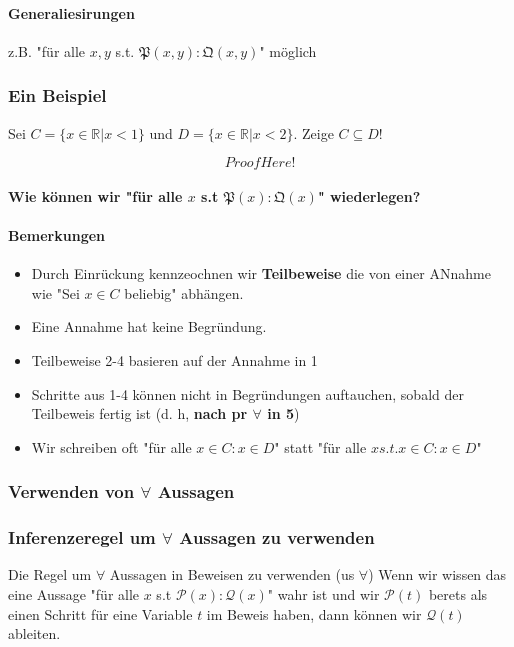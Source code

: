             \paragraph{Generaliesirungen} z.B. "für alle $x, y$ s.t. $\mathfrak{P}(x,y):\mathfrak{Q}(x,y)$" möglich

        \subsubsection{Ein Beispiel} 
            Sei $C = \{x \in \mathbb{R} \vert x < 1\}$ und $D = \{x \in \mathbb{R}\vert x < 2\}$. Zeige $C \subseteq D$! 

            \[Proof Here!\]


        \paragraph*
            {
                Wie können wir "für alle $x$ s.t $\mathfrak{P}(x) : \mathfrak{Q}(x)$" wiederlegen?
            }

        \paragraph{Bemerkungen}
            \begin{itemize}
                \item Durch Einrückung kennzeochnen wir \textbf{Teilbeweise} die von einer ANnahme wie "Sei $x \in C$ beliebig" abhängen.
                \item Eine Annahme hat keine Begründung.
                \item Teilbeweise 2-4 basieren auf der Annahme in 1
                \item Schritte aus 1-4 können nicht in Begründungen auftauchen, sobald der Teilbeweis fertig ist (d. h, \textbf{nach pr $\forall$ in 5})
                \item Wir schreiben oft "für alle $x \in C : x \in D$" statt "für alle $x s.t. x \in C : x \in D$" 
            \end{itemize}

        \subsubsection{Verwenden von $\forall$ Aussagen}
        \subsubsection{Inferenzeregel um $\forall$ Aussagen zu verwenden}
        {
            Die Regel um $\forall$ Aussagen in Beweisen zu verwenden (us $\forall$)
            }
        {
            Wenn wir wissen das eine Aussage "für alle $x$ s.t $\mathcal{P}(x) : \mathcal{Q}(x)$" wahr ist und wir $\mathcal{P}(t)$ berets als einen Schritt für eine Variable $t$ im Beweis haben, dann können wir $\mathcal{Q}(t)$ ableiten.
        }
            
